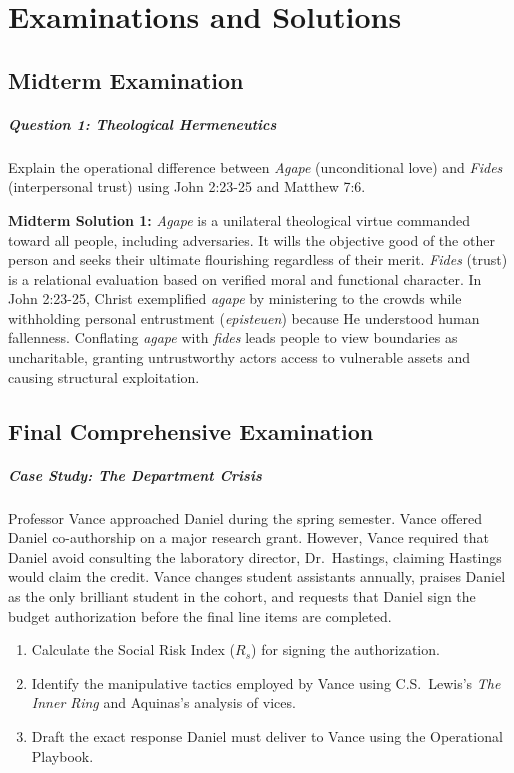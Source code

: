 \documentclass[11pt]{report}
\begin{document}
\chapter{Examinations and Solutions}

\section{Midterm Examination}

\paragraph{Question 1: Theological Hermeneutics}
Explain the operational difference between \textit{Agape} (unconditional love) and \textit{Fides} (interpersonal trust) using John 2:23-25 and Matthew 7:6.

\begin{blackboard}
\textbf{Midterm Solution 1:}
\textit{Agape} is a unilateral theological virtue commanded toward all people, including adversaries. It wills the objective good of the other person and seeks their ultimate flourishing regardless of their merit. \textit{Fides} (trust) is a relational evaluation based on verified moral and functional character. In John 2:23-25, Christ exemplified \textit{agape} by ministering to the crowds while withholding personal entrustment (\textit{episteuen}) because He understood human fallenness. Conflating \textit{agape} with \textit{fides} leads people to view boundaries as uncharitable, granting untrustworthy actors access to vulnerable assets and causing structural exploitation.
\end{blackboard}

\section{Final Comprehensive Examination}

\paragraph{Case Study: The Department Crisis}
Professor Vance approached Daniel during the spring semester. Vance offered Daniel co-authorship on a major research grant. However, Vance required that Daniel avoid consulting the laboratory director, Dr.~Hastings, claiming Hastings would claim the credit. Vance changes student assistants annually, praises Daniel as the only brilliant student in the cohort, and requests that Daniel sign the budget authorization before the final line items are completed.
\begin{enumerate}
    \item Calculate the Social Risk Index ($R_s$) for signing the authorization.
    \item Identify the manipulative tactics employed by Vance using C.S.~Lewis's \textit{The Inner Ring} and Aquinas's analysis of vices.
    \item Draft the exact response Daniel must deliver to Vance using the Operational Playbook.
\end{enumerate}
\end{document}
